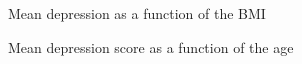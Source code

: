 \begin{figure}[H]
\caption{Mean depression as a function of the BMI}
\label{fig:cesd}
\end{figure}


\begin{figure}[H]
\caption{Mean depression score as a function of the age}
\label{fig:agecesd}
\end{figure}



